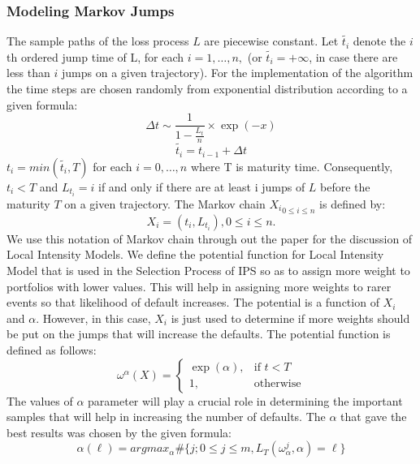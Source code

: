 \subsubsection{Modeling Markov Jumps}
The sample paths of the loss process $L$ are piecewise constant. Let $\tilde{t_{i}}$ denote the $i$th ordered jump time of L, for each $i = 1, \dots , n,$ (or $\tilde{t_{i}}  = + \infty$, in case there are less than $i$ jumps on a given trajectory). For the implementation of the algorithm the time steps are chosen randomly from exponential distribution according to a given formula:
\begin{equation}
\label{eqn:evolve}
\Delta t \sim \frac{1}{1-\frac{L_{t}}{n}} \times \exp(-x)
\end{equation}
\begin{equation}
\tilde{t_{i}} = t_{i-1} +  \Delta t
\end{equation}
$t_{i} = min(\tilde{t_{i}},T)$ for each $i = 0, \dots, n$ where T is maturity time. Consequently, $t_{i} < T$ and $L_{t_{i}} = i$ if and only if there are at least i jumps of $L$ before the maturity $T$ on a given trajectory. The Markov chain ${X_{i}}_{0 \leq i \leq n}$ is defined by: \\
\begin{equation}
X_{i} = (t_{i}, L_{t_{i}}), 0 \leq i \leq n.
\end{equation}
We use this notation of Markov chain through out the paper for the discussion of Local Intensity Models. 
We define the potential function for Local Intensity Model that is used in the Selection Process of IPS so as to assign more weight to portfolios with lower values. This will help in assigning more weights to rarer events so that likelihood of default increases. The potential is a function of $X_{i}$ and $\alpha$. However, in this case, $X_{i}$ is just used to determine if more weights should be put on the jumps that will increase the defaults. The potential function is defined as follows:
\begin{equation}
\omega^{\alpha}(X) = 
\begin{cases}
\exp(\alpha), & \text{if } t < T\\
1,               & \text{otherwise}
\end{cases}
\end{equation}
The values of $\alpha$ parameter will play a crucial role in determining the important samples that will help in increasing the number of defaults. The $\alpha$ that gave the best results was chosen by the given formula:
\begin{equation}
\alpha(\ell) = argmax_{\alpha} \# \{ j; 0 \leq j \leq m, L_{T}(\omega_{\alpha}^{j},\alpha) = \ell \}
\end{equation}
